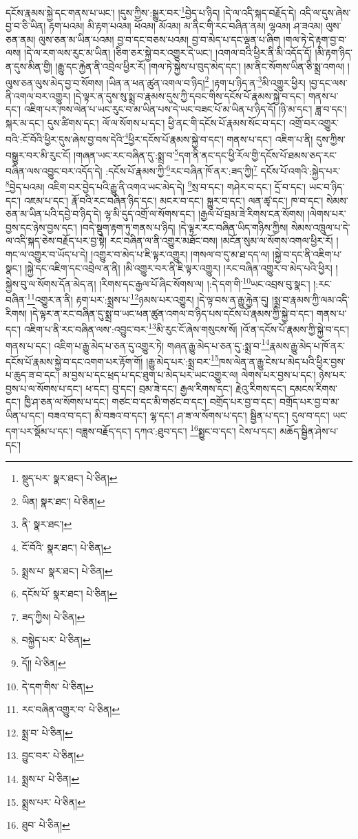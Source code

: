 དངོས་རྣམས་སྐྱེ་དང་གནས་པ་ཡང་། །དུས་ཀྱིས་:སྒྱུར་བར་\footnote{སྡུད་པར་  སྣར་ཐང་།  པེ་ཅིན། }བྱེད་པ་ཉིད། །དེ་ལ་འདི་སྐད་བརྗོད་དེ། འདི་ལ་དུས་ཞེས་བྱ་བ་ཅི་ཡིན། རྟག་པའམ། མི་རྟག་པའམ། ཕོའམ། མོའམ། མ་ནིང་གི་རང་བཞིན་ནམ། ལྷའམ། ཤ་ཟའམ། ལུས་ཅན་ནམ། ལུས་ཅན་མ་ཡིན་པའམ། བྱ་བ་དང་བཅས་པའམ། བྱ་བ་མེད་པ་དང་ལྡན་པ་ཞིག །གལ་ཏེ་དེ་རྟག་བྱ་བ་ལས། །དེ་ལ་རག་ལས་རུང་མ་ཡིན། །ཅིག་ཅར་སྐྱེ་བར་འགྱུར་དེ་ཡང་། །འགལ་བའི་ཕྱིར་ནི་མི་འདོད་དོ། །མི་རྟག་ཉིད་ན་དུས་མིན་གྱི། །རྒྱུ་དང་རྐྱེན་ནི་འབྲེལ་ཕྱིར་རོ། །གལ་ཏེ་སྐྱེས་པ་བུད་མེད་དང་། །མ་ནིང་སོགས་ཡིན་ཅི་སྨྲ་འགལ། །ལུས་ཅན་ལུས་མེད་བྱ་བ་སོགས། །ཡིན་ན་ཕན་ཚུན་འགལ་བ་ཉིད།\footnote{ཡིན།  སྣར་ཐང་།  པེ་ཅིན། } །རྟག་པ་ཉིད་ན་\footnote{ནི་  སྣར་ཐང་། }མི་འགྱུར་ཕྱིར། །བྱ་དང་ལས་ནི་འགལ་བར་འགྱུར། །དེ་ལྟར་ན་དུས་སུ་སྨྲ་བ་རྣམས་དུས་ཀྱི་དབང་གིས་དངོས་པོ་རྣམས་སྐྱེ་བ་དང་། གནས་པ་དང་། འཇིག་པར་ཁས་ལེན་པ་ཡང་རུང་བ་མ་ཡིན་པས་དེ་ཡང་བཟང་པོ་མ་ཡིན་པ་ཉིད་དོ། །ཉི་མ་དང་། ཟླ་བ་དང་། སྐར་མ་དང་། དུས་ཚིགས་དང་། ལོ་ལ་སོགས་པ་དང་། ཕྱི་ནང་གི་དངོས་པོ་རྣམས་སོང་བ་དང་། འགྲོ་བར་འགྱུར་བའི་:ངོ་བོའི་ཕྱིར་དུས་ཞེས་བྱ་བས་དེའི་\footnote{ངོ་བོའི་  སྣར་ཐང་།  པེ་ཅིན། }ཕྱིར་དངོས་པོ་རྣམས་སྐྱེ་བ་དང་། གནས་པ་དང་། འཇིག་པ་ནི། དུས་ཀྱིས་བསྒྱུར་བར་མི་རུང་ངོ། །གཞན་ཡང་རང་བཞིན་དུ་:སྨྲ་བ་\footnote{སྨྲས་པ་  སྣར་ཐང་།  པེ་ཅིན། }དག་ནི་ནང་དང་ཕྱི་རོལ་གྱི་དངོས་པོ་ཐམས་ཅད་རང་བཞིན་ལས་འབྱུང་བར་འདོད་དེ། :དངོས་པོ་རྣམས་ཀྱི་\footnote{དངོས་པོ་  སྣར་ཐང་།  པེ་ཅིན། }རང་བཞིན་ཁོ་ནར་:ཟད་ཀྱི།\footnote{ཟད་ཀྱིས།  པེ་ཅིན། } དངོས་པོ་འགའི་:སྐྱེད་པར་\footnote{བསྐྱེད་པར་  པེ་ཅིན། }བྱེད་པའམ། འཇིག་བར་བྱེད་པའི་རྒྱུ་ནི་འགའ་ཡང་མེད་དེ། \footnote{དོ།།   པེ་ཅིན། }སྲ་བ་དང་། གཤེར་བ་དང་། དྲོ་བ་དང་། ཡང་བ་ཉིད་དང་། འཇམ་པ་དང་། རྣོ་བའི་རང་བཞིན་ཉིད་དང་། མངར་བ་དང་། སྐྱུར་བ་དང་། ལན་ཚྭ་དང་། ཁ་བ་དང་། སེམས་ཅན་མ་ཡིན་པའི་དབྱེ་བ་ཉིད་དེ། ལྷ་མི་དུད་འགྲོ་ལ་སོགས་དང་། །རྒྱལ་པོ་བྲམ་ཟེ་རིགས་ངན་སོགས། །ལེགས་པར་བྱས་དང་ཉེས་བྱས་དང་། །བདེ་སྡུག་རྟག་ཏུ་གནས་པ་ཉིད། །དེ་ལྟར་རང་བཞིན་ཡིད་གཉིས་ཀྱིས། སེམས་འཁྲུལ་པ་དེ་ལ་འདི་སྐད་ཅེས་བརྗོད་པར་བྱ་སྟེ། རང་བཞིན་ལ་ནི་འགྱུར་མཐོང་བས། །མངོན་སུམ་ལ་སོགས་འགལ་ཕྱིར་རོ། །གང་ལ་འགྱུར་བ་ཡོད་པ་དེ། །འགྱུར་བ་མེད་པ་ཇི་ལྟར་འགྱུར། །གསལ་བ་དུ་མ་ཐ་དད་ལ། །སྐྱེ་བ་དང་ནི་འཇིག་པ་སྣང་། །སྐྱེ་དང་འཇིག་དང་འབྲེལ་ན་ནི། །མི་འགྱུར་བར་ནི་ཇི་ལྟར་འགྱུར། །རང་བཞིན་འགྱུར་བ་མེད་པའི་ཕྱིར། །སྐྱེས་བུ་ལ་སོགས་དོན་མེད་ན། །རིགས་དང་རྒྱལ་པོ་ཞིང་སོགས་ལ། །:དེ་དག་གི་\footnote{དེ་དག་གིས་  པེ་ཅིན། }ཡང་འབྲས་བུ་སྣང་། །:རང་བཞིན་\footnote{རང་བཞིན་འགྱུར་བ་  པེ་ཅིན། }འགྱུར་ན་ནི། རྟག་པར་:སྨྲས་པ་\footnote{སྨྲ་བ་  པེ་ཅིན། }ཉམས་པར་འགྱུར། །དེ་ལྟ་བས་ན་རྒྱུ་རྐྱེན་དུ། །སྨྲ་བ་རྣམས་ཀྱི་ལམ་འདི་རིགས། །དེ་ལྟར་ན་རང་བཞིན་དུ་སྨྲ་བ་ཡང་ཕན་ཚུན་འགལ་བ་ཉིད་པས་དངོས་པོ་རྣམས་ཀྱི་སྐྱེ་བ་དང་། གནས་པ་དང་། འཇིག་པ་ནི་རང་བཞིན་ལས་:འབྱུང་བར་\footnote{བྱུང་བར་  པེ་ཅིན། }མི་རུང་ངོ་ཞེས་གསུངས་སོ། །འོ་ན་དངོས་པོ་རྣམས་ཀྱི་སྐྱེ་བ་དང་། གནས་པ་དང་། འཇིག་པ་རྒྱུ་མེད་པ་ཅན་དུ་འགྱུར་ཏེ། གཞན་རྒྱུ་མེད་པ་ཅན་དུ་:སྨྲ་བ་\footnote{སྨྲས་པ་  པེ་ཅིན། }རྣམས་རྒྱུ་མེད་པ་ཁོ་ནར་དངོས་པོ་རྣམས་སྐྱེ་བ་དང་འགག་པར་རྟོག་གོ། །རྒྱུ་མེད་པར་:སྨྲ་བར་\footnote{སྨྲས་པར་  པེ་ཅིན། }ཁས་ལེན་ན་རྒྱུ་ངེས་པ་མེད་པའི་ཕྱིར་བྱས་པ་ཆུད་ཟ་བ་དང་། མ་བྱས་པ་དང་ཕྲད་པ་དང་ཐུག་པ་མེད་པར་ཡང་འགྱུར་ལ། ལེགས་པར་བྱས་པ་དང་། ཉེས་པར་བྱས་པ་ལ་སོགས་པ་དང་། ཕ་དང་། བུ་དང་། བྲམ་ཟེ་དང་། རྒྱལ་རིགས་དང་། རྗེའུ་རིགས་དང་། དམངས་རིགས་དང་། ཁྱི་ཤ་ཅན་ལ་སོགས་པ་དང་། གཙང་བ་དང་མི་གཙང་བ་དང་། བགྲོད་པར་བྱ་བ་དང་། བགྲོད་པར་བྱ་བ་མ་ཡིན་པ་དང་། བཟའ་བ་དང་། མི་བཟའ་བ་དང་། ལྷ་དང་། ཤ་ཟ་ལ་སོགས་པ་དང་། སྦྱིན་པ་དང་། དུལ་བ་དང་། ཡང་དག་པར་སྡོམ་པ་དང་། བཟླས་བརྗོད་དང་། དཀའ་:ཐུབ་དང་། \footnote{ཐུབ་  པེ་ཅིན། }སྨྱུང་བ་དང་། ངེས་པ་དང་། མཆོད་སྦྱིན་ཤེས་པ་དང་། 